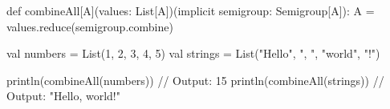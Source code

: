 def combineAll[A](values: List[A])(implicit semigroup: Semigroup[A]): A =
  values.reduce(semigroup.combine)

val numbers = List(1, 2, 3, 4, 5)
val strings = List("Hello", ", ", "world", "!")

println(combineAll(numbers)) // Output: 15
println(combineAll(strings)) // Output: "Hello, world!"